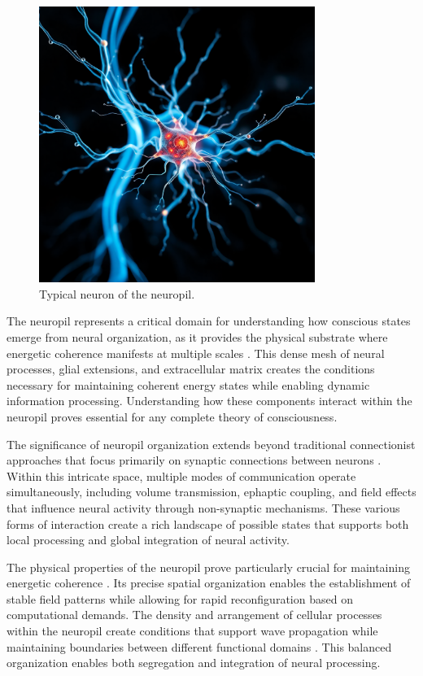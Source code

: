 \begin{figure}[h]
    \centering
    \includegraphics[width=0.8\textwidth]{images/neuropil2.png}

    \caption{Typical neuron of the neuropil.}
\end{figure}

The neuropil represents a critical domain for understanding how conscious states emerge from neural organization, as it provides the physical substrate where energetic coherence manifests at multiple scales \cite{Ventura1999}. This dense mesh of neural processes, glial extensions, and extracellular matrix creates the conditions necessary for maintaining coherent energy states while enabling dynamic information processing. Understanding how these components interact within the neuropil proves essential for any complete theory of consciousness.

The significance of neuropil organization extends beyond traditional connectionist approaches that focus primarily on synaptic connections between neurons \cite{Kasthuri2015}. Within this intricate space, multiple modes of communication operate simultaneously, including volume transmission, ephaptic coupling, and field effects that influence neural activity through non-synaptic mechanisms. These various forms of interaction create a rich landscape of possible states that supports both local processing and global integration of neural activity.

The physical properties of the neuropil prove particularly crucial for maintaining energetic coherence \cite{Korogod2015}. Its precise spatial organization enables the establishment of stable field patterns while allowing for rapid reconfiguration based on computational demands. The density and arrangement of cellular processes within the neuropil create conditions that support wave propagation while maintaining boundaries between different functional domains \cite{Arbib1998}. This balanced organization enables both segregation and integration of neural processing.

